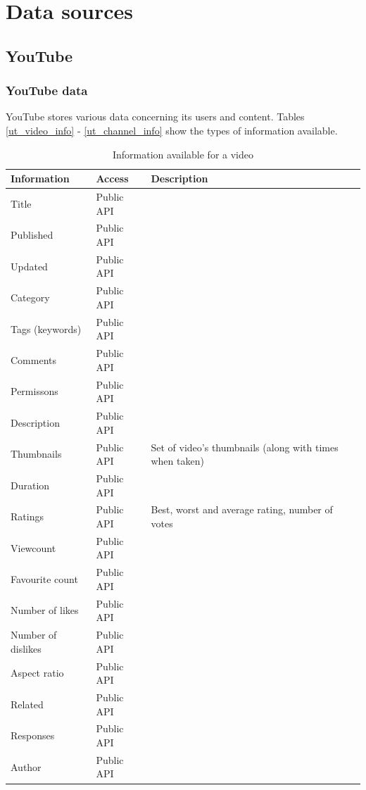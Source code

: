 \section{Data sources}
\subsection{YouTube}
\subsubsection{YouTube data}
YouTube stores various data concerning its users and content. Tables
\ref{ut_video_info} - \ref{ut_channel_info} show the types of information
available.

\begin{table}[ht]
	\begin{tabular}{|p{3cm} | l | p{4cm}|}\hline
		Information & Access & Description\\ \hline

		Title & Public API & \\
		Published & Public API & \\
		Updated & Public API & \\
		Category & Public API & \\
		Tags (keywords) & Public API & \\
		Comments & Public API & \\
		Permissons & Public API & \\
		Description & Public API & \\
		Thumbnails & Public API & Set of video's thumbnails (along with times
		when taken) \\
		Duration & Public API & \\
		Ratings & Public API & Best, worst and average rating, number of votes \\
		Viewcount & Public API & \\
		Favourite count & Public API & \\
		Number of likes & Public API & \\
		Number of dislikes & Public API & \\
		Aspect ratio & Public API & \\
		Related & Public API & \\
		Responses & Public API & \\
		Author & Public API & \\ \hline
	\end{tabular}
	\caption{Information available for a video}
\end{table}


